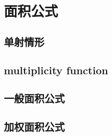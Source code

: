 \section{面积公式}
\label{b1:sec:1703}


\subsection{单射情形}
\label{b1:subsec:170301}

\subsection{multiplicity function}
\label{b1:subsec:170302}

\subsection{一般面积公式}
\label{b1:subsec:170303}

\subsection{加权面积公式}
\label{b1:subsec:170304}



